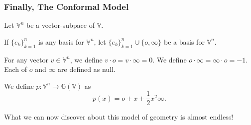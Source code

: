 \documentclass{beamer}
\newcommand{\G}{\mathbb{G}}
\newcommand{\V}{\mathbb{V}}
\newcommand{\nvao}{o}
\newcommand{\nvai}{\infty}
\begin{document}
\begin{frame}
\frametitle{Finally, The Conformal Model}
Let $\V^n$ be a vector-subpace of $\V$.

If $\{e_k\}_{k=1}^n$ is any basis for $\V^n$, let $\{e_k\}_{k=1}^n\cup\{\nvao,\nvai\}$
be a basis for $\V^n$.
\begin{definition}
For any vector $v\in\V^n$, we define $v\cdot\nvao=v\cdot\nvai=0$.  We
define $\nvao\cdot\nvai=\nvai\cdot\nvao=-1$.  Each of $\nvao$ and $\nvai$
are defined as null.
\end{definition}
\begin{definition}
We define $p:\V^n\to\G(\V)$ as
\begin{equation*}
p(x) = \nvao + x + \frac{1}{2}x^2\nvai.
\end{equation*}
\end{definition}
What we can now discover about this model of geometry is almost endless!
\end{frame}
\end{document}
